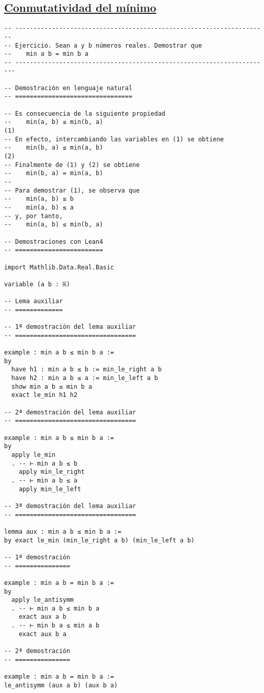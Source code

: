 \subsection{\href{./src/Basicos/Conmutatividad\_del\_minimo.lean}{Conmutatividad del mínimo}}
\label{sec:org758ece1}
\begin{verbatim}
-- ---------------------------------------------------------------------
-- Ejercicio. Sean a y b números reales. Demostrar que
--    min a b = min b a
-- ----------------------------------------------------------------------

-- Demostración en lenguaje natural
-- ================================

-- Es consecuencia de la siguiente propiedad
--    min(a, b) ≤ min(b, a)                                          (1)
-- En efecto, intercambiando las variables en (1) se obtiene
--    min(b, a) ≤ min(a, b)                                          (2)
-- Finalmente de (1) y (2) se obtiene
--    min(b, a) = min(a, b)
--
-- Para demostrar (1), se observa que
--    min(a, b) ≤ b
--    min(a, b) ≤ a
-- y, por tanto,
--    min(a, b) ≤ min(b, a)

-- Demostraciones con Lean4
-- ========================

import Mathlib.Data.Real.Basic

variable (a b : ℝ)

-- Lema auxiliar
-- =============

-- 1ª demostración del lema auxiliar
-- =================================

example : min a b ≤ min b a :=
by
  have h1 : min a b ≤ b := min_le_right a b
  have h2 : min a b ≤ a := min_le_left a b
  show min a b ≤ min b a
  exact le_min h1 h2

-- 2ª demostración del lema auxiliar
-- =================================

example : min a b ≤ min b a :=
by
  apply le_min
  . -- ⊢ min a b ≤ b
    apply min_le_right
  . -- ⊢ min a b ≤ a
    apply min_le_left

-- 3ª demostración del lema auxiliar
-- =================================

lemma aux : min a b ≤ min b a :=
by exact le_min (min_le_right a b) (min_le_left a b)

-- 1ª demostración
-- ===============

example : min a b = min b a :=
by
  apply le_antisymm
  . -- ⊢ min a b ≤ min b a
    exact aux a b
  . -- ⊢ min b a ≤ min a b
    exact aux b a

-- 2ª demostración
-- ===============

example : min a b = min b a :=
le_antisymm (aux a b) (aux b a)
\end{verbatim}

